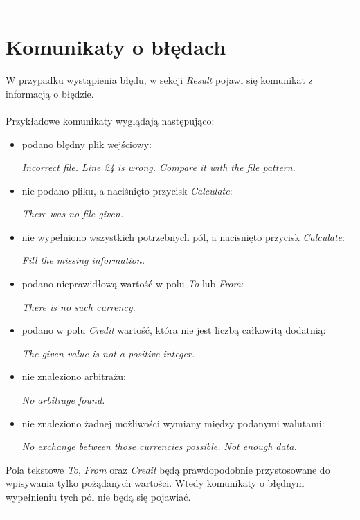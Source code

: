 \documentclass[a4paper,11pt]{article}
\newcommand{\linia}{\rule{\linewidth}{0.4mm}}
\begin{document}
\noindent\linia
\section{Komunikaty o błędach}
W przypadku wystąpienia błędu, w sekcji \textit{Result} pojawi się komunikat z informacją o błędzie. 
\\\\
Przykładowe komunikaty wyglądają następująco:
\begin{itemize}
\item podano błędny plik wejściowy:

\textit{Incorrect file. Line 24 is wrong. Compare it with the file pattern.}
\item nie podano pliku, a naciśnięto przycisk \textit{Calculate}:

\textit{There was no file given.}
\item nie wypełniono wszystkich potrzebnych pól, a nacisnięto przycisk \textit{Calculate}:

\textit{Fill the missing information.}
\item podano nieprawidłową wartość w polu \textit{To} lub \textit{From}:

\textit{There is no such currency.}
\item podano w polu \textit{Credit} wartość, która nie jest liczbą całkowitą dodatnią:

\textit{The given value is not a positive integer.}
\item nie znaleziono arbitrażu:

\textit{No arbitrage found.}
\item nie znaleziono żadnej możliwości wymiany między podanymi walutami:

\textit{No exchange between those currencies possible. Not enough data.}
\end{itemize}

Pola tekstowe \textit{To}, \textit{From} oraz \textit{Credit} będą prawdopodobnie przystosowane do wpisywania tylko pożądanych wartości. Wtedy komunikaty o błędnym wypełnieniu tych pól nie będą się pojawiać.

\noindent\linia
\end{document}
